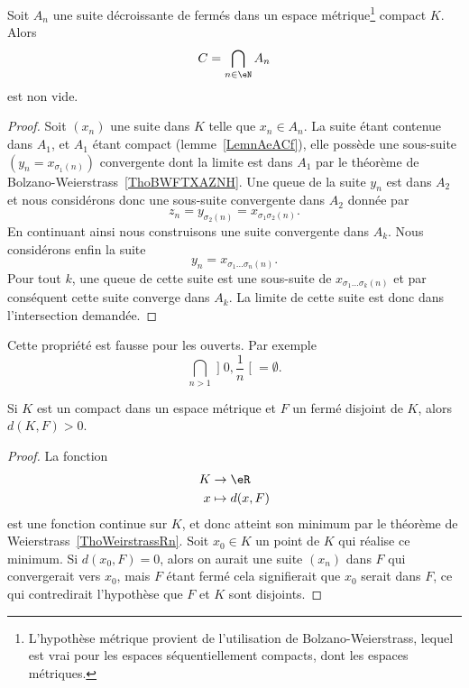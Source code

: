 \begin{lemma}       \label{LemooynkH}
	Soit \( A_n\) une suite décroissante de fermés dans un espace métrique\footnote{L'hypothèse métrique provient de l'utilisation de Bolzano-Weierstrass, lequel est vrai pour les espaces séquentiellement compacts, dont les espaces métriques.} compact \( K\). Alors
	\begin{equation}
		C=\bigcap_{n\in \eN}A_n
	\end{equation}
	est non vide.
\end{lemma}

\begin{proof}
	Soit \( (x_n)\) une suite dans \( K\) telle que \( x_n\in A_n\). La suite étant contenue dans \( A_1\), et \( A_1\) étant compact (lemme~\ref{LemnAeACf}), elle possède une sous-suite \( (y_n=x_{\sigma_1(n)})\) convergente dont la limite est dans \( A_1\) par le théorème de Bolzano-Weierstrass~\ref{ThoBWFTXAZNH}. Une queue de la suite \( y_n\) est dans \( A_2\) et nous considérons donc une sous-suite convergente dans \( A_2\) donnée par
	\begin{equation}
		z_n=y_{\sigma_2(n)}=x_{\sigma_1\sigma_2(n)}.
	\end{equation}
	En continuant ainsi nous construisons une suite convergente dans \( A_k\). Nous considérons enfin la suite
	\begin{equation}
		y_n=x_{\sigma_1\ldots \sigma_n(n)}.
	\end{equation}
	Pour tout \( k\), une queue de cette suite est une sous-suite de \( x_{\sigma_1\ldots \sigma_k(n)}\) et par conséquent cette suite converge dans \( A_k\). La limite de cette suite est donc dans l'intersection demandée.
\end{proof}

\begin{remark}
	Cette propriété est fausse pour les ouverts. Par exemple
	\begin{equation}
		\bigcap_{n>1}\mathopen] 0 , \frac{1}{ n } \mathclose[=\emptyset.
	\end{equation}
\end{remark}

\begin{lemma}   \label{LemKIcAbic}
	Si \( K\) est un compact dans un espace métrique et \( F\) un fermé disjoint de \( K\), alors \( d(K,F)>0\).
\end{lemma}

\begin{proof}
	La fonction
	\begin{equation}
		\begin{aligned}
			K & \to \eR        \\
			x & \mapsto d(x,F)
		\end{aligned}
	\end{equation}
	est une fonction continue sur \( K\), et donc atteint son minimum par le théorème de Weierstrass~\ref{ThoWeirstrassRn}. Soit \( x_0\in K\) un point de \( K\) qui réalise ce minimum. Si \( d(x_0,F)=0\), alors on aurait une suite \( (x_n)\) dans \( F\) qui convergerait vers \( x_0\), mais \( F\) étant fermé cela signifierait que \( x_0\) serait dans \( F\), ce qui contredirait l'hypothèse que \( F\) et \( K\) sont disjoints.
\end{proof}

